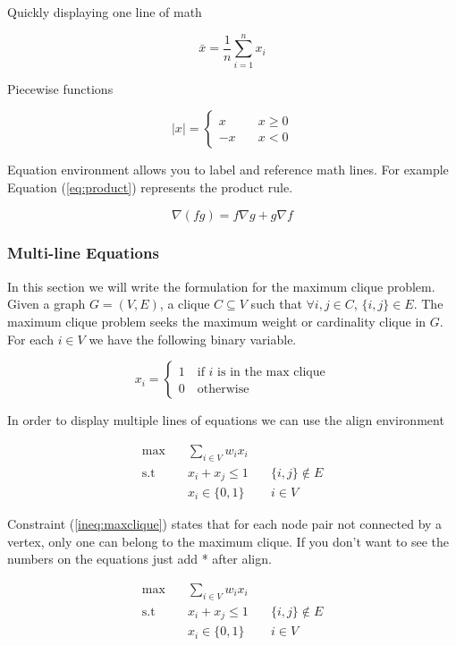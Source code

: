 \documentclass{article}
\begin{document}
Quickly displaying one line of math

\[
\bar{x} = \dfrac{1}{n}\sum_{i=1}^n x_i
\]

Piecewise functions

\[
\left| x \right| = \begin{cases}
x \quad &x \geq 0\\
-x \quad &x < 0
\end{cases}
\]

Equation environment allows you to label and reference math lines. For example Equation (\ref{eq:product}) represents the product rule.

\begin{equation}
    \nabla(fg) = f \nabla g + g \nabla f \label{eq:product}
\end{equation}

\subsubsection{Multi-line Equations}\label{subsubsec:multiline}

In this section we will write the formulation for the maximum clique problem. Given a graph $G=(V,E)$, a clique $C \subseteq V$ such that $\forall i,j \in C$, $\lbrace i,j \rbrace \in E$. The maximum clique problem seeks the maximum weight or cardinality clique in $G$. For each $i \in V$ we have the following binary variable.

\[
x_i = \begin{cases}
1 \quad \text{if $i$ is in the max clique}\\
0 \quad \text{otherwise}
\end{cases}
\]

 In order to display multiple lines of equations we can use the align environment

\begin{align}
    \max \quad &\sum_{i \in V} w_i x_i &\\
    \text{s.t} \quad &x_i + x_j \leq 1 \quad &\lbrace i, j \rbrace \notin E \label{ineq:maxclique}\\
    &x_i \in \lbrace 0,1 \rbrace \quad &i \in V
\end{align}

Constraint (\ref{ineq:maxclique}) states that for each node pair not connected by a vertex, only one can belong to the maximum clique. If you don't want to see the numbers on the equations just add * after align.

\begin{align*}
    \max \quad &\sum_{i \in V} w_i x_i &\\
	\text{s.t} \quad &x_i + x_j \leq 1 \quad &\lbrace i, j \rbrace \notin E \\
	&x_i \in \lbrace 0,1 \rbrace \quad &i \in V
\end{align*}
\end{document}
